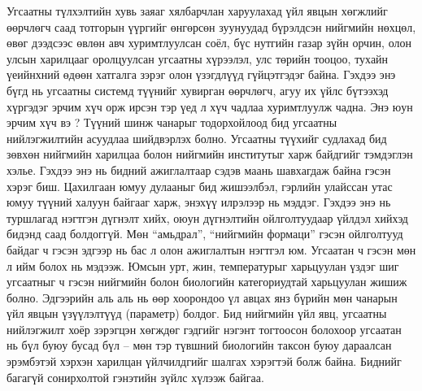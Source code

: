 Угсаатны түлхэлтийн хувь заяаг хялбарчлан харуулахад үйл явцын хөгжлийг өөрчлөгч саад тотгорын үүргийг өнгөрсөн зуунуудад бүрэлдсэн нийгмийн нөхцөл, өвөг дээдсээс өвлөн авч хуримтлуулсан соёл, бүс нутгийн газар зүйн орчин, олон улсын харилцааг оролцуулсан угсаатны хүрээлэл, улс төрийн тооцоо, тухайн үеийнхний өдөөн хатгалга зэрэг олон үзэгдлүүд гүйцэтгэдэг байна. Гэхдээ энэ бүгд нь угсаатны системд түүнийг хувирган өөрчлөгч, агуу их үйлс бүтээхэд хүргэдэг эрчим хүч орж ирсэн тэр үед л хүч чадлаа хуримтлуулж чадна.
Энэ юун эрчим хүч вэ ? Түүний шинж чанарыг тодорхойлоод бид угсаатны нийлэгжилтийн асуудлаа шийдвэрлэх болно.
Угсаатны түүхийг судлахад бид зөвхөн нийгмийн харилцаа болон нийгмийн институтыг харж байдгийг тэмдэглэн хэлье. Гэхдээ энэ нь бидний ажиглалтаар сэдэв маань шавхагдаж байна гэсэн хэрэг биш. Цахилгаан юмуу дулааныг бид жишээлбэл, гэрлийн улайссан утас юмуу түүний халуун байгааг харж, энэхүү илрэлээр нь мэддэг. Гэхдээ энэ нь туршлагад нэгтгэн дүгнэлт хийх, оюун дүгнэлтийн ойлголтуудаар үйлдэл хийхэд бидэнд саад болдоггүй. Мөн “амьдрал”, “нийгмийн формаци” гэсэн ойлголтууд байдаг ч гэсэн эдгээр нь бас л олон ажиглалтын нэгтгэл юм. Угсаатан ч гэсэн мөн л ийм болох нь мэдээж.
Юмсын урт, жин, температурыг харьцуулан үздэг шиг угсаатныг ч гэсэн нийгмийн болон биологийн категориудтай харьцуулан жишиж болно. Эдгээрийн аль аль нь өөр хоорондоо үл авцах янз бүрийн мөн чанарын үйл явцын үзүүлэлтүүд (параметр) болдог. Бид нийгмийн үйл явц, угсаатны нийлэгжилт хоёр зэрэгцэн хөгждөг гэдгийг нэгэнт тогтоосон болохоор угсаатан нь бүл буюу бусад бүл – мөн тэр түвшний биологийн таксон буюу дараалсан эрэмбэтэй хэрхэн харилцан үйлчилдгийг шалгах хэрэгтэй болж байна. Биднийг багагүй сонирхолтой гэнэтийн зүйлс хүлээж байгаа.
